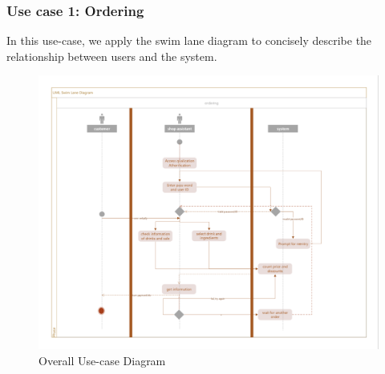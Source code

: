 \documentclass[a4paper]{report}
\begin{document}
\subsubsection{Use case 1: Ordering}
In this use-case, we apply the swim lane diagram to concisely describe the relationship between users and the system.
\begin{figure}
  \centering
  \includegraphics[scale=0.44]{figure2.jpg}
  \caption{Overall Use-case Diagram}\label{2}
\end{figure}
\end{document}
